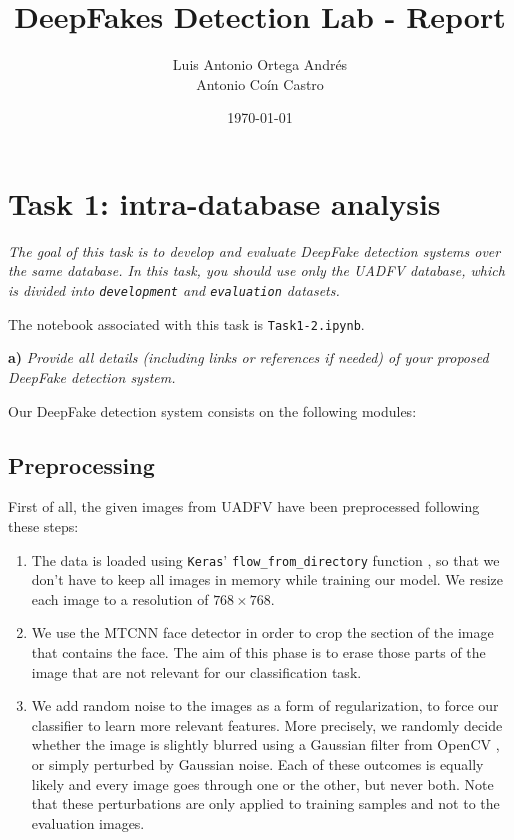 \documentclass[11pt]{article}
\author{Luis Antonio Ortega Andrés\\Antonio Coín Castro}
\date{\today}
\title{DeepFakes Detection Lab - Report}
\begin{document}
\maketitle

\section*{Task 1: intra-database analysis}

\textit{The goal of this task is to develop and evaluate DeepFake detection systems over the same database. In this task, you should use only the UADFV database, which is divided into \texttt{development} and \texttt{evaluation} datasets.}

The notebook associated with this task is \texttt{Task1-2.ipynb}.

\textbf{a)} \textit{Provide all details (including links or references if needed) of your proposed DeepFake detection system.}

Our DeepFake detection system consists on the following modules:
\subsection*{Preprocessing}

First of all, the given images from UADFV have been preprocessed following these steps:
\begin{enumerate}
  \item The data is loaded using \texttt{Keras}' \texttt{flow\_from\_directory} function \citep{chollet2015keras}, so that we don't have to keep all images in memory while training our model. We resize each image to a resolution of $768\times 768$.
  \item We use the MTCNN face detector \citep{zhang2016joint} in order to crop the section of the image that contains the face. The aim of this phase is to erase those parts of the image that are not relevant for our classification task.
  \item We add random noise to the images as a form of regularization, to force our classifier to learn more relevant features. More precisely, we randomly decide whether the image is slightly blurred using a Gaussian filter from OpenCV \citep{opencv_library}, or simply perturbed by Gaussian noise. Each of these outcomes is equally likely and every image goes through one or the other, but never both. Note that these perturbations are only applied to training samples and not to the evaluation images.
\end{enumerate}
\end{document}
